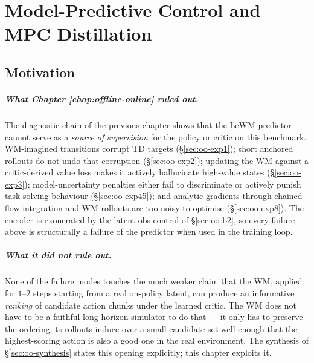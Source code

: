 \chapter{Model-Predictive Control and MPC Distillation}
\label{chap:mpc-distill}

\section{Motivation}
\label{sec:mpc-motivation}

\paragraph{What Chapter \ref{chap:offline-online} ruled out.} The diagnostic chain of the previous chapter shows that the LeWM predictor cannot serve as a \emph{source of supervision} for the policy or critic on this benchmark. WM-imagined transitions corrupt TD targets (\S\ref{sec:oo-exp1}); short anchored rollouts do not undo that corruption (\S\ref{sec:oo-exp2}); updating the WM against a critic-derived value loss makes it actively hallucinate high-value states (\S\ref{sec:oo-exp3}); model-uncertainty penalties either fail to discriminate or actively punish task-solving behaviour (\S\ref{sec:oo-exp45}); and analytic gradients through chained flow integration and WM rollouts are too noisy to optimise (\S\ref{sec:oo-exp8}). The encoder is exonerated by the latent-obs control of \S\ref{sec:oo-b2}, so every failure above is structurally a failure of the predictor when used in the training loop.

\paragraph{What it did not rule out.} None of the failure modes touches the much weaker claim that the WM, applied for $1$--$2$ steps starting from a real on-policy latent, can produce an informative \emph{ranking} of candidate action chunks under the learned critic. The WM does not have to be a faithful long-horizon simulator to do that --- it only has to preserve the ordering its rollouts induce over a small candidate set well enough that the highest-scoring action is also a good one in the real environment. The synthesis of \S\ref{sec:oo-synthesis} states this opening explicitly; this chapter exploits it.

